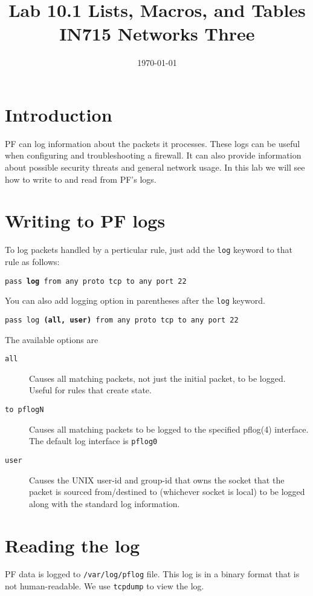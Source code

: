 \documentclass{article}
\begin{document}
\title{ Lab 10.1 Lists, Macros, and Tables\\ IN715 Networks Three}
\date{\today}
\maketitle

\section*{Introduction}
PF can log information about the packets it processes.  These logs can be useful when configuring and troubleshooting 
a firewall.  It can also provide information about possible security threats and general network usage.  In this lab
we will see how to write to and read from PF's logs.

\section{Writing to PF logs}
To log packets handled by a perticular rule, just add the \texttt{log} keyword to that rule as follows:

\texttt{pass \textbf{log} from any proto tcp to any port 22}

You can also add logging option in parentheses after the \texttt{log} keyword.

\texttt{pass log \textbf{(all, user)} from any proto tcp to any port 22}

The available options are

\begin{description}
	\item[\texttt{all}] Causes all matching packets, not just the initial packet, to be logged. Useful for rules that create state.
	\item[\texttt{to pflogN}] Causes all matching packets to be logged to the specified pflog(4) interface. The default log interface is \texttt{pflog0}
	\item[\texttt{user}] Causes the UNIX user-id and group-id that owns the socket that the packet is sourced from/destined to (whichever socket is local) to be logged along with the standard log information.
\end{description}

\section{Reading the log}
PF data is logged to \texttt{/var/log/pflog} file.  This log is in a binary format that is not human-readable.  We use \texttt{tcpdump} to view the log.
\end{document}
